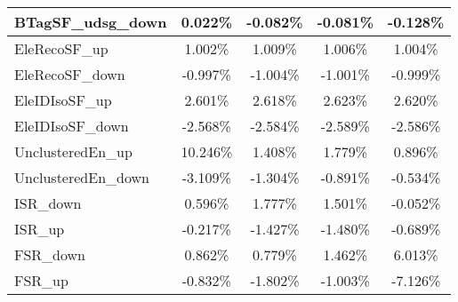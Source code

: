 \begin{table}[]
{\begin{tabular}{|l|c|c|c|c|}
BTagSF\_udsg\_down                          & 0.022\%                           & -0.082\%                           & -0.081\%                          & -0.128\%                           \\ \hline     
EleRecoSF\_up                            & 1.002\%                             & 1.009\%                             & 1.006\%                            & 1.004\%                             \\ \hline    
EleRecoSF\_down                          & -0.997\%                           & -1.004\%                           & -1.001\%                          & -0.999\%                           \\ \hline    
EleIDIsoSF\_up                              & 2.601\%                               & 2.618\%                               & 2.623\%                              & 2.620\%                               \\ \hline    
EleIDIsoSF\_down                            & -2.568\%                             & -2.584\%                             & -2.589\%                            & -2.586\%                             \\ \hline        
UnclusteredEn\_up                         & 10.246\%                          & 1.408\%                          & 1.779\%                         & 0.896\%                          \\ \hline    
UnclusteredEn\_down                      & -3.109\%                         & -1.304\%                        & -0.891\%                       & -0.534\%                        \\ \hline   \hline 
ISR\_down                                & 0.596\%                                   & 1.777\%                                  & 1.501\%                                 & -0.052\%                                  \\ \hline
ISR\_up                                  & -0.217\%                                     & -1.427\%                                    & -1.480\%                                   & -0.689\%                                    \\ \hline
FSR\_down                                & 0.862\%                                   & 0.779\%                                  & 1.462\%                                 & 6.013\%                                  \\ \hline
FSR\_up                                  & -0.832\%                                     & -1.802\%                                    & -1.003\%                                   & -7.126\%                                    \\ \hline 

\end{tabular}}
\end{table}
